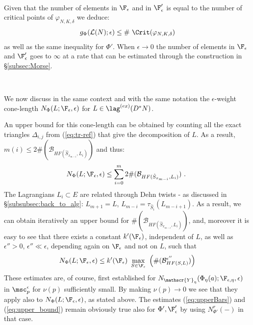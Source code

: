 \

Given that the number of elements in $\F_{\epsilon}$ and in $\F'_{\epsilon}$ is
equal to the number of critical points of $\varphi_{N,K,\delta}$  we deduce:
$$g_{\Phi}(\mathcal{L}(N);\epsilon)\leq  \# \ \Crit (\varphi_{N,K, \delta})$$
as well as the same inequality for $\Phi'$.
When $\epsilon \to 0$ the number of elements in $\F_{\epsilon}$ and $\F'_{\epsilon}$ 
goes to $\infty$ at a rate that can be estimated through the construction in  \S\ref{subsec:Morse}.

\

We now discuss in the same context and with the same notation the $\epsilon$-weight cone-length
$N_{\Phi}(L;\F_{\epsilon}, \epsilon)$ for $L\in \lag^{(ex)}(D^{\ast}N)$.  






  
An upper bound for this cone-length can be obtained by counting all the exact triangles $\Delta_{i,j}$ from (\ref{eq:tr-ref}) that  give the decomposition of $L$. As a result, $m(i)\leq 2 \#(\mathcal{B}_ {HF(\hat{S}_{x_{m-i}}, L_{i})})$ and 
 thus:
 \begin{equation}\label{eq:upperBars}N_{\Phi}(L;\F_{\epsilon},\epsilon)\leq\sum_{i=0}^{m}2 \#(\mathcal{B}_ {HF(\hat{S}_{x_{m-i}}, L_{i})}) ~.~
 \end{equation}
The Lagrangians $L_{i}\subset E$ are related through Dehn  twists  - as discussed in \S\ref{subsubsec:back_to_alg}: $L_{m+1}=L$,  $L_{m-i}=\tau_{\hat{S}_{i}}(L_{m-i+1})$.
As a result, we can obtain iteratively an upper bound for $\#(\mathcal{B}_{HF(\hat{S}_{x_{m-i}}, L_{i})})$, and, moreover it is easy to see that there exists a constant $k'(\F_{\epsilon})$, independent of $L$, as well as $\epsilon''>0$, $\epsilon'' \ll \epsilon$, depending again on $\F_{\epsilon}$ and not on $L$, such that
\begin{equation}\label{eq:upper_bound}
N_{\Phi}(L;\F_{\epsilon}, \epsilon)\leq k'(\F_{\epsilon})\ \max_{S\in \F_{\epsilon}}\ \left( \#(\mathcal{B}^{\epsilon''}_{HF(S,L)}) \right)
\end{equation}
These estimates are, of course, first established for $N_{\mathscr{Y}_{\eta}}(\Phi_{\eta}(a); \F_{\epsilon,\eta}, \epsilon)$ in  $\msc_{p}^{\epsilon}$ for $\nu(p)$ sufficiently small. By making $\nu(p)\to 0$ we see that they apply  also to $N_{\Phi}(L;\F_{\epsilon}, \epsilon)$, as stated above. 
The estimates  (\ref{eq:upperBars})  and (\ref{eq:upper_bound}) remain obviously true also for $\Phi',\F'_{\epsilon}$ by using $N^{r}_{\Phi'}( - )$ in that case.  

